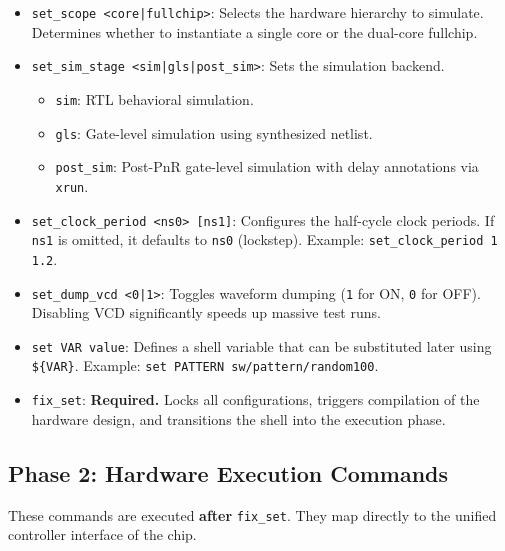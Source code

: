 \documentclass[journal]{IEEEtran}
\begin{document}
\begin{itemize}
    \item \texttt{set\_scope <core|fullchip>}: Selects the hardware hierarchy to simulate. Determines whether to instantiate a single core or the dual-core fullchip.
    \item \texttt{set\_sim\_stage <sim|gls|post\_sim>}: Sets the simulation backend.
    \begin{itemize}
        \item \texttt{sim}: RTL behavioral simulation.
        \item \texttt{gls}: Gate-level simulation using synthesized netlist.
        \item \texttt{post\_sim}: Post-PnR gate-level simulation with delay annotations via \texttt{xrun}.
    \end{itemize}
    \item \texttt{set\_clock\_period <ns0> [ns1]}: Configures the half-cycle clock periods. If \texttt{ns1} is omitted, it defaults to \texttt{ns0} (lockstep). Example: \texttt{set\_clock\_period 1 1.2}.
    \item \texttt{set\_dump\_vcd <0|1>}: Toggles waveform dumping (\texttt{1} for ON, \texttt{0} for OFF). Disabling VCD significantly speeds up massive test runs.
    \item \texttt{set VAR value}: Defines a shell variable that can be substituted later using \texttt{\$\{VAR\}}. Example: \texttt{set PATTERN sw/pattern/random100}.
    \item \texttt{fix\_set}: \textbf{Required.} Locks all configurations, triggers compilation of the hardware design, and transitions the shell into the execution phase.
\end{itemize}

\subsection{Phase 2: Hardware Execution Commands}
These commands are executed \textbf{after} \texttt{fix\_set}. They map directly to the unified controller interface of the chip.
\end{document}
